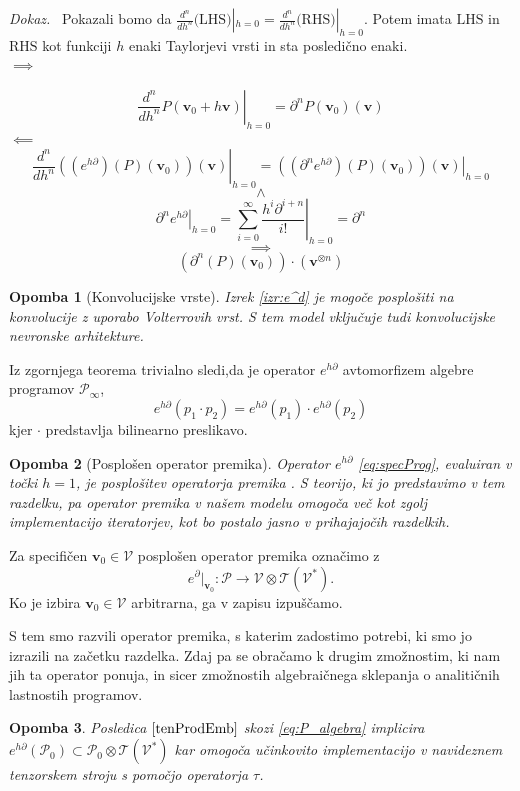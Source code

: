 \documentclass[a4paper, 12pt]{book}
\newcommand{\ed}{e^{h\partial}}
\newcommand{\T}{\mathcal{T}}
\newcommand{\VV}{\mathcal{V}}
\newcommand{\vv}{\mathbf{v}}
\newcommand{\dP}{\mathcal{P}}
\newcommand{\D}{\partial}
\newcommand{\sumd}{\tau}
\newtheorem{opomba}{Opomba}[chapter]
\newenvironment{dokaz}{\emph{Dokaz.}\ }{\hspace{\fill}{$\Box$}}
\begin{document}
 \begin{dokaz}
Pokazali bomo da $\frac{d^n}{dh^n}\text{(LHS)}|_{h=0}=\frac{d^n}{dh^n}\text{(RHS)}|_{h=0}$. Potem imata $\text{LHS}$ in $\text{RHS}$ kot funkciji $h$ enaki Taylorjevi vrsti in sta posledično enaki.\\
 $\implies$
 
 $$\left. \frac{d^n}{dh^n}P(\vv_0+h\vv)\right|_{h=0}=\D^n P(\vv_0)(\vv)$$
 $\impliedby$
 $$\left. \frac{d^n}{dh^n}\left((e^{h\D})(P)(\vv_0)\right)(\vv)\right|_{h=0}=
\left. \left((\D^n e^{h\D})(P)(\vv_0)\right)(\vv)\right|_{h=0}$$
 $$\land$$
 $$\left. \D^ne^{h\D}\right| _{h=0}=\left. \sum\limits_{i=0}^{\infty}\frac{h^i\D^{i+n}}{i!}\right|_{h=0}=\D^n$$
 $$\implies$$
 $$\left(\D^n(P)(\vv_0)\right)\cdot(\vv^{\otimes n})$$
 \end{dokaz}
 \begin{opomba}[Konvolucijske vrste]
 \label{konvVrst}
 Izrek \ref{izr:e^d} je mogoče posplošiti na konvolucije z uporabo Volterrovih vrst. S tem model vključuje tudi konvolucijske nevronske arhitekture.
 \end{opomba}
 
 \noindent Iz zgornjega teorema trivialno sledi,da je operator $\ed$ avtomorfizem algebre programov $\dP_\infty$,
 \begin{equation}\label{eq:prod}
  	e^{h\D}(p_1\cdot p_2)=e^{h\D}(p_1)\cdot e^{h\D}(p_2)
  \end{equation}
  kjer $\cdot$ predstavlja bilinearno preslikavo.
\begin{opomba}[Posplošen operator premika]\label{rmrk:genShift}
Operator $e^{h\D}$ \eqref{eq:specProg}, evaluiran v točki $h=1$, je posplošitev operatorja premika \cite{OpCalc}. S teorijo, ki jo predstavimo v tem razdelku, pa operator premika v našem modelu omogoča več kot zgolj implementacijo iteratorjev, kot bo postalo jasno v prihajajočih razdelkih.
\end{opomba}

\noindent Za specifičen $\vv_0\in\VV$ posplošen operator premika označimo z
 \begin{equation*}
 e^\D\vert_{\vv_0}:\dP\to \VV\otimes \T(\VV^*).
 \end{equation*}
Ko je izbira $\vv_0\in\VV$ arbitrarna, ga v zapisu izpuščamo.

S tem smo razvili operator premika, s katerim zadostimo potrebi, ki smo jo izrazili na začetku razdelka. Zdaj pa se obračamo k drugim zmožnostim, ki nam jih ta operator ponuja, in sicer zmožnostih algebraičnega sklepanja o analitičnih lastnostih programov.
 \begin{opomba}
 Posledica $\ref{tenProdEmb}$ skozi \eqref{eq:P_algebra} implicira
      	$e^{h\D}(\dP_0)\subset\dP_0\otimes \T(\VV^*)$      
 kar omogoča učinkovito implementacijo v navideznem tenzorskem stroju s pomočjo operatorja $\sumd$. 
\end{opomba}
\end{document}
